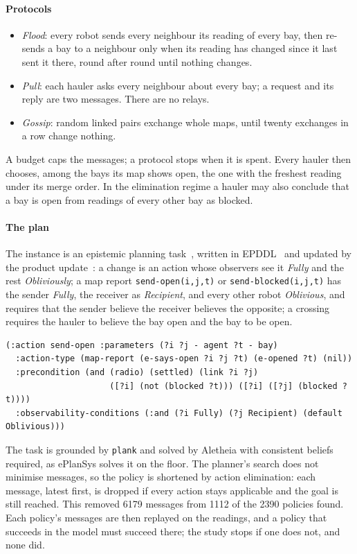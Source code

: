 \documentclass[11pt,a4paper]{article}
\theoremstyle{definition}
\newcommand{\code}[1]{\texttt{\small #1}}
\begin{document}
\paragraph{Protocols}
\begin{itemize}[leftmargin=1.4em, itemsep=2pt]
  \item \emph{Flood}: every robot sends every neighbour its reading of every
        bay, then re-sends a bay to a neighbour only when its reading has changed
        since it last sent it there, round after round until nothing changes.
  \item \emph{Pull}: each hauler asks every neighbour about every bay; a request
        and its reply are two messages. There are no relays.
  \item \emph{Gossip}: random linked pairs exchange whole maps, until twenty
        exchanges in a row change nothing.
\end{itemize}
A budget caps the messages; a protocol stops when it is spent. Every hauler then
chooses, among the bays its map shows open, the one with the freshest reading under
its merge order. In the elimination regime a hauler may also conclude that a bay
is open from readings of every other bay as blocked.

\paragraph{The plan} The instance is an epistemic planning
task~\cite{ba2011}, written in EPDDL~\cite{ulises2026sm} and updated by the
product update~\cite{bms1998}: a
change is an action whose observers see it \emph{Fully} and the rest
\emph{Obliviously}; a map report \code{send-open(i,j,t)} or
\code{send-blocked(i,j,t)} has the sender \emph{Fully}, the receiver as
\emph{Recipient}, and every other robot \emph{Oblivious}, and requires that the
sender believe the receiver believes the opposite; a crossing requires the hauler
to believe the bay open and the bay to be open.

\begin{lstlisting}[language={}]
(:action send-open :parameters (?i ?j - agent ?t - bay)
  :action-type (map-report (e-says-open ?i ?j ?t) (e-opened ?t) (nil))
  :precondition (and (radio) (settled) (link ?i ?j)
                     ([?i] (not (blocked ?t))) ([?i] ([?j] (blocked ?t))))
  :observability-conditions (:and (?i Fully) (?j Recipient) (default Oblivious)))
\end{lstlisting}

The task is grounded by \code{plank} and solved by Aletheia with consistent
beliefs required, as ePlanSys solves it on the floor. The planner's search does not
minimise messages, so the policy is shortened by action elimination: each message,
latest first, is dropped if every action stays applicable and the goal is still
reached. This removed 6179 messages from 1112 of the 2390 policies found. Each
policy's messages are then replayed on the readings, and a policy that succeeds in
the model must succeed there; the study stops if one does not, and none did.
\end{document}
